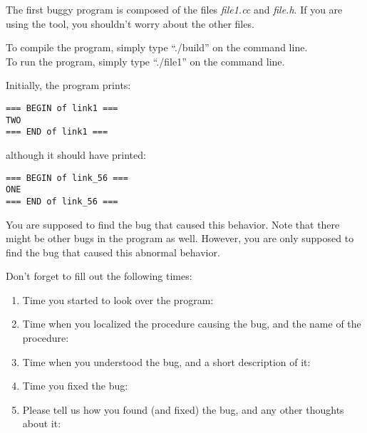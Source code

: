 \documentclass{article}
\title{}
\author{Debugging experiment - Bug 1}
\date{July 30, 2003}
\begin{document}
\maketitle
\begin{flushleft}
\vspace{0.5in}

\thispagestyle{empty}

The first buggy program is composed of the files {\it file1.cc} and 
{\it file.h}. If you are using the tool, you shouldn't worry about the 
other files.

\vspace{0.1in}
To compile the program, simply type ``./build'' on the command line.\\
To run the program, simply type ``./file1'' on the command line.


\vspace{0.1in}
Initially, the program prints:

\begin{verbatim}
=== BEGIN of link1 ===
TWO
=== END of link1 ===
\end{verbatim}

although it should have printed:
\begin{verbatim}
=== BEGIN of link_56 ===
ONE
=== END of link_56 ===
\end{verbatim}


You are supposed to find the bug that caused this behavior.  Note that there
might be other bugs in the program as well.  However, you are only supposed
to find the bug that caused this abnormal behavior.  


\vspace{0.2in}
Don't forget to fill out the following times:
\begin{enumerate}
\item{Time you started to look over the program:}
\item{Time when you localized the procedure causing the bug, and the name
      of the procedure:\vspace{0.2in}}
\item{Time when you understood the bug, and a short description of it:\vspace{0.4in}}

\item{Time you fixed the bug:}

\item{Please tell us how you found (and fixed) the bug, and any other thoughts 
about it:}

\end{enumerate}

\end{flushleft}
\end{document}
